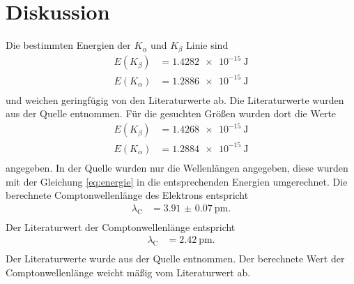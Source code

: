 \section{Diskussion}
\label{sec:Diskussion}

Die bestimmten Energien der $K_\alpha$ und $K_\beta$ Linie sind
\begin{align*}
  E(K_\beta) & = \SI{1.4282e-15}{\joule}\\
  E(K_\alpha) &= \SI{1.2886e-15}{\joule}\\
\end{align*}
und weichen geringfügig von den Literaturwerte ab.
Die Literaturwerte wurden aus der Quelle \cite[6]{roentgen} entnommen.
Für die gesuchten Größen wurden dort die Werte
\begin{align*}
    E(K_\beta) &= \SI{1.4268e-15}{\joule}\\
    E(K_\alpha) &= \SI{ 1.2884e-15}{\joule}\\
\end{align*}
angegeben.
In der Quelle wurden nur die Wellenlängen angegeben, diese wurden mit der Gleichung \eqref{eq:energie} in die entsprechenden Energien umgerechnet.
Die berechnete Comptonwellenlänge des Elektrons entspricht
\begin{align*}
    \lambda_\text{C} &= \SI{3.91(7)}{\pico\meter}.\\
\end{align*}
Der Literaturwert der Comptonwellenlänge entspricht
\begin{align*}
    \lambda_\text{C} &= \SI{2.42}{\pico\meter}.\\
\end{align*}
Der Literaturwerte wurde aus der Quelle \cite{compton} entnommen.
Der berechnete Wert der Comptonwellenlänge weicht mäßig vom Literaturwert ab.
